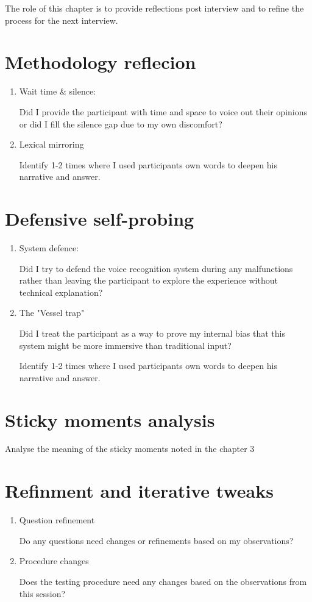 
The role of this chapter is to provide reflections post interview and to refine the process for the next interview.

\section{Methodology reflecion}
\begin{enumerate}
    \item Wait time \& silence: 
    
    Did I provide the participant with time and space to voice out their opinions or did I fill the silence gap due to my own discomfort?
    \item Lexical mirroring 
    
    Identify 1-2 times where I used participants own words to deepen his narrative and answer.
\end{enumerate}

\section{Defensive self-probing}

\begin{enumerate}
    \item System defence: 
    

    Did I try to defend the voice recognition system during any malfunctions rather than leaving the participant to explore the experience
    without technical explanation?

    \item The "Vessel trap"
    
    Did I treat the participant as a way to prove my internal bias that this system might be more immersive than traditional input?
    

    Identify 1-2 times where I used participants own words to deepen his narrative and answer.
\end{enumerate}

\section{Sticky moments analysis}
Analyse the meaning of the sticky moments noted in the chapter 3


\section{Refinment and iterative tweaks}

\begin{enumerate}
    \item Question refinement 
    

    Do any questions need changes or refinements based on my observations?

    \item Procedure changes
    
    Does the testing procedure need any changes based on the observations from this session?

\end{enumerate}
